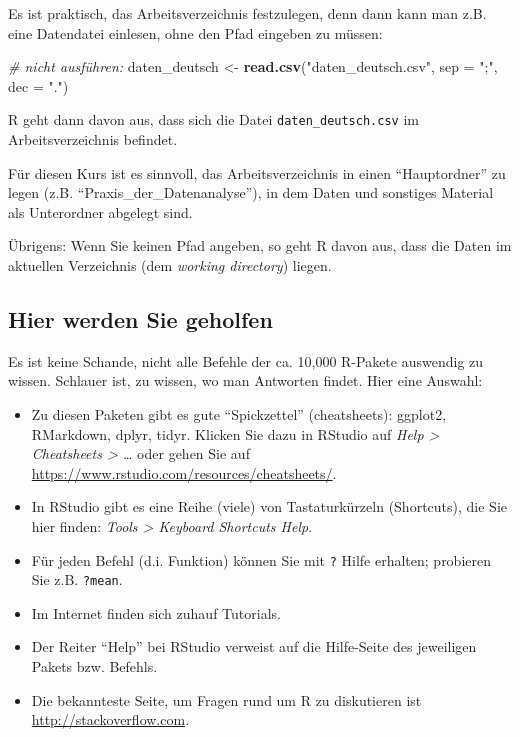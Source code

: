 \documentclass[12pt,ngerman,]{book}
\makeatletter
\newenvironment{Shaded}{\begin{snugshade}}{\end{snugshade}}
\newcommand{\KeywordTok}[1]{\textcolor[rgb]{0.13,0.29,0.53}{\textbf{{#1}}}}
\newcommand{\DataTypeTok}[1]{\textcolor[rgb]{0.13,0.29,0.53}{{#1}}}
\newcommand{\StringTok}[1]{\textcolor[rgb]{0.31,0.60,0.02}{{#1}}}
\newcommand{\CommentTok}[1]{\textcolor[rgb]{0.56,0.35,0.01}{\textit{{#1}}}}
\newcommand{\NormalTok}[1]{{#1}}
\newenvironment{kframe}{%
\medskip{}
\setlength{\fboxsep}{.8em}
 \def\at@end@of@kframe{}%
 \ifinner\ifhmode%
  \def\at@end@of@kframe{\end{minipage}}%
  \begin{minipage}{\columnwidth}%
 \fi\fi%
 \def\FrameCommand##1{\hskip\@totalleftmargin \hskip-\fboxsep
 \colorbox{shadecolor}{##1}\hskip-\fboxsep
     \hskip-\linewidth \hskip-\@totalleftmargin \hskip\columnwidth}%
 \MakeFramed {\advance\hsize-\width
   \@totalleftmargin\z@ \linewidth\hsize
   \@setminipage}}%
 {\par\unskip\endMakeFramed%
 \at@end@of@kframe}
\renewenvironment{Shaded}{\begin{kframe}}{\end{kframe}}
\theoremstyle{definition}
\theoremstyle{definition}
\theoremstyle{remark}
\let\BeginKnitrBlock\begin \let\EndKnitrBlock\end
\makeatother
\begin{document}
Es ist praktisch, das Arbeitsverzeichnis festzulegen, denn dann kann man
z.B. eine Datendatei einlesen, ohne den Pfad eingeben zu müssen:

\begin{Shaded}
\begin{Highlighting}[]
\CommentTok{# nicht ausführen:}
\NormalTok{daten_deutsch <-}\StringTok{ }\KeywordTok{read.csv}\NormalTok{(}\StringTok{"daten_deutsch.csv"}\NormalTok{, }\DataTypeTok{sep =} \StringTok{";"}\NormalTok{, }\DataTypeTok{dec =} \StringTok{"."}\NormalTok{)}
\end{Highlighting}
\end{Shaded}

R geht dann davon aus, dass sich die Datei \texttt{daten\_deutsch.csv}
im Arbeitsverzeichnis befindet.

Für diesen Kurs ist es sinnvoll, das Arbeitsverzeichnis in einen
``Hauptordner'' zu legen (z.B. ``Praxis\_der\_Datenanalyse''), in dem
Daten und sonstiges Material als Unterordner abgelegt sind.

\BeginKnitrBlock{rmdcaution}
Übrigens: Wenn Sie keinen Pfad angeben, so geht R davon aus, dass die
Daten im aktuellen Verzeichnis (dem \emph{working directory}) liegen.
\EndKnitrBlock{rmdcaution}

\subsection{Hier werden Sie geholfen}\label{hier-werden-sie-geholfen}

Es ist keine Schande, nicht alle Befehle der ca. 10,000 R-Pakete
auswendig zu wissen. Schlauer ist, zu wissen, wo man Antworten findet.
Hier eine Auswahl:

\begin{itemize}
\item
  Zu diesen Paketen gibt es gute ``Spickzettel'' (cheatsheets): ggplot2,
  RMarkdown, dplyr, tidyr. Klicken Sie dazu in RStudio auf \emph{Help
  \textgreater{} Cheatsheets \textgreater{} \ldots{}} oder gehen Sie auf
  \url{https://www.rstudio.com/resources/cheatsheets/}.
\item
  In RStudio gibt es eine Reihe (viele) von Tastaturkürzeln (Shortcuts),
  die Sie hier finden: \emph{Tools \textgreater{} Keyboard Shortcuts
  Help}.
\item
  Für jeden Befehl (d.i. Funktion) können Sie mit \texttt{?} Hilfe
  erhalten; probieren Sie z.B. \texttt{?mean}.
\item
  Im Internet finden sich zuhauf Tutorials.
\item
  Der Reiter ``Help'' bei RStudio verweist auf die Hilfe-Seite des
  jeweiligen Pakets bzw. Befehls.
\item
  Die bekannteste Seite, um Fragen rund um R zu diskutieren ist
  \url{http://stackoverflow.com}.
\end{itemize}
\end{document}
